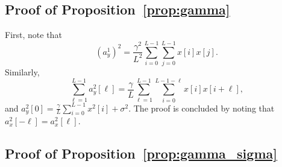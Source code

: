 \documentclass[12pt]{article}
\newcommand{\1}{\mathbf{1}}
\newcommand{\M}{m}
\renewcommand{\L}{\mathcal{L}}
\theoremstyle{plain}
\theoremstyle{definition}
\theoremstyle{remark}
\theoremstyle{plain}
\theoremstyle{remark}
\theoremstyle{plain}
\theoremstyle{plain}
\theoremstyle{plain}
\numberwithin{equation}{section}
\begin{document}
%
%

\subsection{Proof of Proposition~\ref{prop:gamma}} \label{sec:proof_prop_gamma}
First,  note that 
\begin{equation*}
(a^1_y)^2=\frac{\gamma^2}{L^2}\sum_{i=0}^{L-1}\sum_{j=0}^{L-1}x[i]x[j].
\end{equation*}
Similarly,  
\begin{equation*}
\sum_{\ell = 1}^{L-1}a_y^2[\ell]=\frac{\gamma}{L}\sum_{\ell = 1}^{L-1}\sum_{i=0}^{L-1-\ell}x[i]x[i+\ell],
\end{equation*}
and $a_y^2[0]=\frac{\gamma}{L}\sum_{i=0}^{L-1}x^2[i] + \sigma^2$. The proof is concluded by noting that  $a_x^2[-\ell]=a_x^2[\ell]$. 


\subsection{Proof of Proposition~\ref{prop:gamma_sigma}} \label{sec:proof_prop_gamma_sigma}
\end{document}
